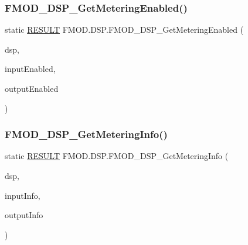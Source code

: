 \subsubsection{\texorpdfstring{F\+M\+O\+D\+\_\+\+D\+S\+P\+\_\+\+Get\+Metering\+Enabled()}{FMOD\_DSP\_GetMeteringEnabled()}}
{\footnotesize\ttfamily static \hyperlink{namespace_f_m_o_d_a305d1176ef3f8c8815861a60407ac33d}{R\+E\+S\+U\+LT} F\+M\+O\+D.\+D\+S\+P.\+F\+M\+O\+D\+\_\+\+D\+S\+P\+\_\+\+Get\+Metering\+Enabled (\begin{DoxyParamCaption}\item[{Int\+Ptr}]{dsp,  }\item[{out bool}]{input\+Enabled,  }\item[{out bool}]{output\+Enabled }\end{DoxyParamCaption})}

\mbox{\label{class_f_m_o_d_1_1_d_s_p_a6687d77ca9c23fa9d8f5f1ca8495b2e3}} 
\subsubsection{\texorpdfstring{F\+M\+O\+D\+\_\+\+D\+S\+P\+\_\+\+Get\+Metering\+Info()}{FMOD\_DSP\_GetMeteringInfo()}}
{\footnotesize\ttfamily static \hyperlink{namespace_f_m_o_d_a305d1176ef3f8c8815861a60407ac33d}{R\+E\+S\+U\+LT} F\+M\+O\+D.\+D\+S\+P.\+F\+M\+O\+D\+\_\+\+D\+S\+P\+\_\+\+Get\+Metering\+Info (\begin{DoxyParamCaption}\item[{Int\+Ptr}]{dsp,  }\item[{\mbox{[}\+Out\mbox{]} \hyperlink{class_f_m_o_d_1_1_d_s_p___m_e_t_e_r_i_n_g___i_n_f_o}{D\+S\+P\+\_\+\+M\+E\+T\+E\+R\+I\+N\+G\+\_\+\+I\+N\+FO}}]{input\+Info,  }\item[{\mbox{[}\+Out\mbox{]} \hyperlink{class_f_m_o_d_1_1_d_s_p___m_e_t_e_r_i_n_g___i_n_f_o}{D\+S\+P\+\_\+\+M\+E\+T\+E\+R\+I\+N\+G\+\_\+\+I\+N\+FO}}]{output\+Info }\end{DoxyParamCaption})}

\mbox{\label{class_f_m_o_d_1_1_d_s_p_a979e52e290de9943a19736d57d507876}} 
